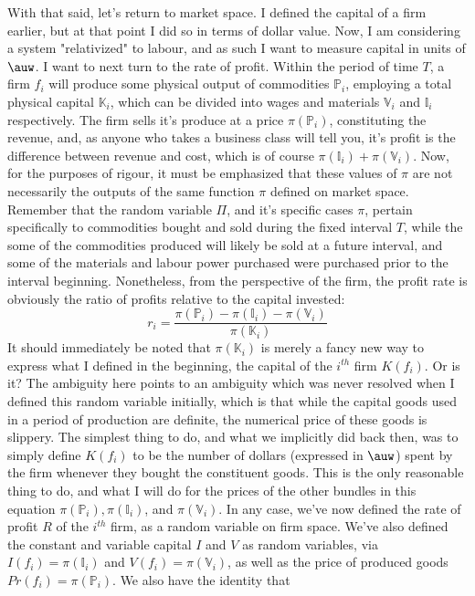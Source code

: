 With that said, let's return to market space. I defined the capital of a firm earlier, but at that point I did so in terms of dollar value. Now, I am considering a system "relativized" to labour, and as such I want to measure capital in units of $\auw$. I want to next turn to the rate of profit. Within the period of time $T$, a firm $f_i$ will produce some physical output of commodities $\mathbb{P}_i$, employing a total physical capital $\mathbb{K}_i$, which can be divided into wages and materials $\mathbb{V}_i$ and $\mathbb{I}_i$ respectively. The firm sells it's produce at a price $\pi(\mathbb{P}_i)$, constituting the revenue, and, as anyone who takes a business class will tell you, it's profit is the difference between revenue and cost, which is of course $\pi(\mathbb{I}_i) + \pi(\mathbb{V}_i)$. Now, for the purposes of rigour, it must be emphasized that these values of $\pi$ are not necessarily the outputs of the same function $\pi$ defined on market space. Remember that the random variable $\Pi$, and it's specific cases $\pi$, pertain specifically to commodities bought and sold during the fixed interval $T$, while the some of the commodities produced will likely be sold at a future interval, and some of the materials and labour power purchased were purchased prior to the interval beginning. Nonetheless, from the perspective of the firm, the profit rate is obviously the ratio of profits relative to the capital invested:
\[ r_i = \frac{\pi(\mathbb{P}_i) - \pi(\mathbb{I}_i) - \pi(\mathbb{V}_i)}{\pi(\mathbb{K}_i)} \]   
It should immediately be noted that $\pi(\mathbb{K}_i)$ is merely a fancy new way to express what I defined in the beginning, the capital of the $i^{th}$ firm $K(f_i)$. Or is it? The ambiguity here points to an ambiguity which was never resolved when I defined this random variable initially, which is that while the capital goods used in a period of production are definite, the numerical price of these goods is slippery. The simplest thing to do, and what we implicitly did back then, was to simply define $K(f_i)$ to be the number of dollars (expressed in $\auw$) spent by the firm whenever they bought the constituent goods. This is the only reasonable thing to do, and what I will do for the prices of the other bundles in this equation $\pi(\mathbb{P}_i), \pi(\mathbb{I}_i)$, and $\pi(\mathbb{V}_i)$. In any case, we've now defined the rate of profit $R$ of the $i^{th}$ firm, as a random variable on firm space. We've also defined the constant and variable capital $I$ and $V$ as random variables, via $I(f_i) = \pi(\mathbb{I}_i)$ and $V(f_i) = \pi(\mathbb{V}_i)$, as well as the price of produced goods $Pr(f_i) = \pi(\mathbb{P}_i)$. We also have the identity that 
